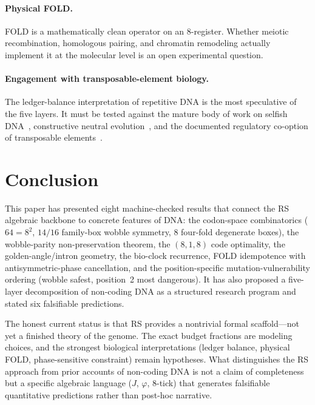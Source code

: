 \documentclass[11pt,a4paper]{article}
\newcommand{\Jcost}{J}
\newcommand{\ph}{\varphi}
\begin{document}
\paragraph{Physical FOLD.}
FOLD is a mathematically clean operator on an 8-register. Whether meiotic recombination, homologous pairing, and chromatin remodeling actually implement it at the molecular level is an open experimental question.

\paragraph{Engagement with transposable-element biology.}
The ledger-balance interpretation of repetitive DNA is the most speculative of the five layers. It must be tested against the mature body of work on selfish DNA~\cite{Orgel1980}, constructive neutral evolution~\cite{Stoltzfus1999}, and the documented regulatory co-option of transposable elements~\cite{Chuong2017}.

\section{Conclusion}
\label{sec:conclusion}

This paper has presented eight machine-checked results that connect the RS algebraic backbone to concrete features of DNA: the codon-space combinatorics ($64 = 8^2$, $14/16$ family-box wobble symmetry, $8$ four-fold degenerate boxes), the wobble-parity non-preservation theorem, the $(8,1,8)$ code optimality, the golden-angle/intron geometry, the bio-clock recurrence, FOLD idempotence with antisymmetric-phase cancellation, and the position-specific mutation-vulnerability ordering (wobble safest, position~2 most dangerous). It has also proposed a five-layer decomposition of non-coding DNA as a structured research program and stated six falsifiable predictions.

The honest current status is that RS provides a nontrivial formal scaffold---not yet a finished theory of the genome. The exact budget fractions are modeling choices, and the strongest biological interpretations (ledger balance, physical FOLD, phase-sensitive constraint) remain hypotheses. What distinguishes the RS approach from prior accounts of non-coding DNA is not a claim of completeness but a specific algebraic language ($\Jcost$, $\ph$, 8-tick) that generates falsifiable quantitative predictions rather than post-hoc narrative.
\end{document}
